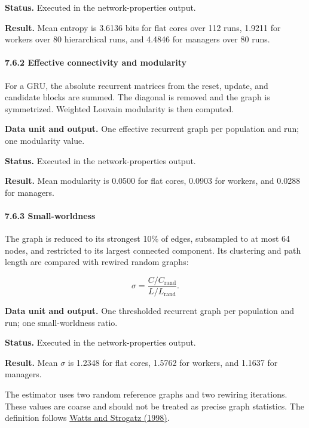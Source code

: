 \documentclass[
  10pt,
]{article}
\begin{document}
\textbf{Status.} Executed in the network-properties output.

\textbf{Result.} Mean entropy is 3.6136 bits for flat cores over 112
runs, 1.9211 for workers over 80 hierarchical runs, and 4.4846 for
managers over 80 runs.

\hypertarget{effective-connectivity-and-modularity}{%
\paragraph{7.6.2 Effective connectivity and
modularity}\label{effective-connectivity-and-modularity}}

For a GRU, the absolute recurrent matrices from the reset, update, and
candidate blocks are summed. The diagonal is removed and the graph is
symmetrized. Weighted Louvain modularity is then computed.

\textbf{Data unit and output.} One effective recurrent graph per
population and run; one modularity value.

\textbf{Status.} Executed in the network-properties output.

\textbf{Result.} Mean modularity is 0.0500 for flat cores, 0.0903 for
workers, and 0.0288 for managers.

\hypertarget{small-worldness}{%
\paragraph{7.6.3 Small-worldness}\label{small-worldness}}

The graph is reduced to its strongest 10\% of edges, subsampled to at
most 64 nodes, and restricted to its largest connected component. Its
clustering and path length are compared with rewired random graphs:

\[
\sigma
=
\frac{C/C_{\mathrm{rand}}}{L/L_{\mathrm{rand}}}.
\]

\textbf{Data unit and output.} One thresholded recurrent graph per
population and run; one small-worldness ratio.

\textbf{Status.} Executed in the network-properties output.

\textbf{Result.} Mean \(\sigma\) is 1.2348 for flat cores, 1.5762 for
workers, and 1.1637 for managers.

The estimator uses two random reference graphs and two rewiring
iterations. These values are coarse and should not be treated as precise
graph statistics. The definition follows
\href{https://doi.org/10.1038/30918}{Watts and Strogatz (1998)}.
\end{document}
